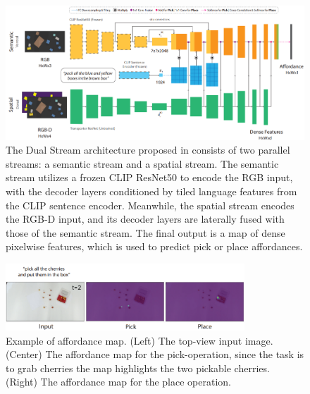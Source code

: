 \begin{figure}[t]
    \centering
    \includegraphics[width=\textwidth]{figures/images/clip_port/architecture.png}
    \caption{The Dual Stream architecture proposed in \cite{shridhar2022cliport} consists of two parallel streams: a semantic stream and a spatial stream. The semantic stream utilizes a frozen CLIP ResNet50 to encode the RGB input, with the decoder layers conditioned by tiled language features from the CLIP sentence encoder. Meanwhile, the spatial stream encodes the RGB-D input, and its decoder layers are laterally fused with those of the semantic stream. The final output is a map of dense pixelwise features, which is used to predict pick or place affordances.}
    \label{fig:clip_port_architecture}
\end{figure}

\begin{figure}[t]
    \centering
    \includegraphics[width=0.8\textwidth]{figures/images/clip_port/affordance_map.png}
    \caption{Example of affordance map. (Left) The top-view input image. (Center) The affordance map for the pick-operation, since the task is to grab cherries the map highlights the two pickable cherries. (Right) The affordance map for the place operation.}
    \label{fig:clip_port_affordance}
\end{figure}